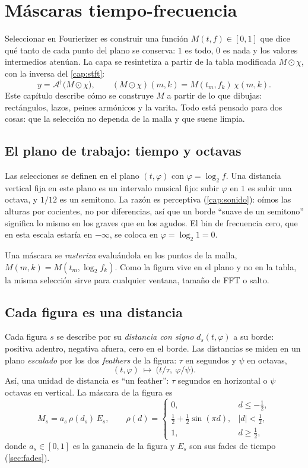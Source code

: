 \chapter{Máscaras tiempo-frecuencia}\label{cap:mascaras}

Seleccionar en Fourierizer es construir una función $M(t,f)\in[0,1]$ que dice qué tanto de cada
punto del plano se conserva: $1$ es todo, $0$ es nada y los valores intermedios atenúan. La capa se
resintetiza a partir de la tabla modificada $M\odot\chi$, con la inversa del \cref{cap:stft}:
\[
  y=\mathcal A^{\dagger}\bigl(M\odot\chi\bigr),\qquad (M\odot\chi)(m,k)=M(t_m,f_k)\,\chi(m,k).
\]
Este capítulo describe cómo se construye $M$ a partir de lo que dibujas: rectángulos, lazos,
peines armónicos y la varita. Todo está pensado para dos cosas: que la selección no dependa de la
malla y que suene limpia.

\section{El plano de trabajo: tiempo y octavas}

Las selecciones se definen en el plano $(t,\varphi)$ con $\varphi=\log_2 f$. Una distancia vertical
fija en este plano es un intervalo musical fijo: subir $\varphi$ en $1$ es subir una octava, y
$1/12$ es un semitono. La razón es perceptiva (\cref{cap:sonido}): oímos las alturas por cocientes,
no por diferencias, así que un borde ``suave de un semitono'' significa lo mismo en los graves que
en los agudos. El bin de frecuencia cero, que en esta escala estaría en $-\infty$, se coloca en
$\varphi=\log_2 1=0$.

Una máscara se \emph{rasteriza} evaluándola en los puntos de la malla, $M(m,k)=M(t_m,\log_2 f_k)$.
Como la figura vive en el plano y no en la tabla, la misma selección sirve para cualquier ventana,
tamaño de FFT o salto.

\section{Cada figura es una distancia}

Cada figura $s$ se describe por su \emph{distancia con signo} $d_s(t,\varphi)$ a su borde:
positiva adentro, negativa afuera, cero en el borde. Las distancias se miden en un plano
\emph{escalado} por los dos \emph{feathers} de la figura: $\tau$ en segundos y $\psi$ en octavas,
\[
  (t,\varphi)\ \longmapsto\ \bigl(t/\tau,\ \varphi/\psi\bigr).
\]
Así, una unidad de distancia es ``un feather'': $\tau$ segundos en horizontal o $\psi$ octavas en
vertical. La máscara de la figura es
\[
  M_s=a_s\,\rho(d_s)\,E_s,\qquad
  \rho(d)=\begin{cases}0,&d\le-\tfrac12,\\[2pt]\tfrac12+\tfrac12\sin(\pi d),&|d|<\tfrac12,\\[2pt]1,&d\ge\tfrac12,\end{cases}
\]
donde $a_s\in[0,1]$ es la ganancia de la figura y $E_s$ son sus fades de tiempo
(\cref{sec:fades}).


